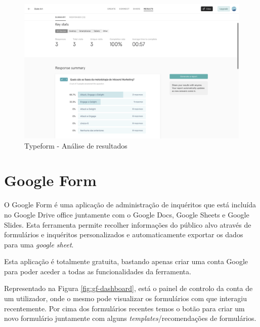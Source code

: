 \newpage
\begin{figure}[ht!]
	\begin{center}
		\includegraphics[width=1\textwidth]{img/tf/tf-question-results}
		\caption{Typeform - Análise de resultados}
		\label{fig:tf-question-results}
	\end{center}
\end{figure}

\section{Google Form}
\label{googleform}

O Google Form é uma aplicação de administração de inquéritos que está incluída no Google Drive office juntamente com o Google Docs\cite{gdocs}, Google Sheets e Google Slides\cite{gslides}. Esta ferramenta permite recolher informações do público alvo através de formulários e inquéritos personalizados e automaticamente exportar os dados para uma \textit{google sheet}.

Esta aplicação é totalmente gratuita, bastando  apenas criar uma conta Google para poder aceder a todas as funcionalidades da ferramenta.

Representado na Figura \ref{fig:gf-dashboard}, está o painel de controlo da conta de um utilizador, onde o mesmo pode visualizar os formulários com que interagiu recentemente. Por cima dos formulários recentes temos o botão para criar um novo formulário juntamente com alguns \textit{templates}/recomendações de formulários.

\newpage


